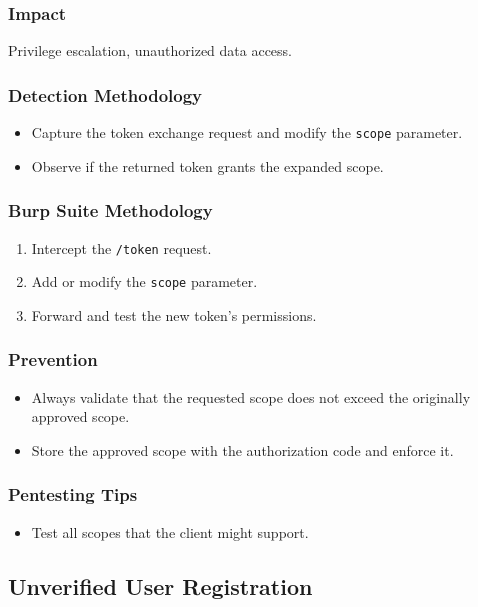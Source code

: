 \documentclass[12pt,a4paper]{article}
\begin{document}
\subsubsection{Impact}
Privilege escalation, unauthorized data access.

\subsubsection{Detection Methodology}
\begin{itemize}
    \item Capture the token exchange request and modify the \texttt{scope} parameter.
    \item Observe if the returned token grants the expanded scope.
\end{itemize}

\subsubsection{Burp Suite Methodology}
\begin{enumerate}
    \item Intercept the \texttt{/token} request.
    \item Add or modify the \texttt{scope} parameter.
    \item Forward and test the new token's permissions.
\end{enumerate}

\subsubsection{Prevention}
\begin{itemize}
    \item Always validate that the requested scope does not exceed the originally approved scope.
    \item Store the approved scope with the authorization code and enforce it.
\end{itemize}
 
\subsubsection{Pentesting Tips}
\begin{itemize}
    \item Test all scopes that the client might support.
\end{itemize}


\subsection{Unverified User Registration}
\end{document}

